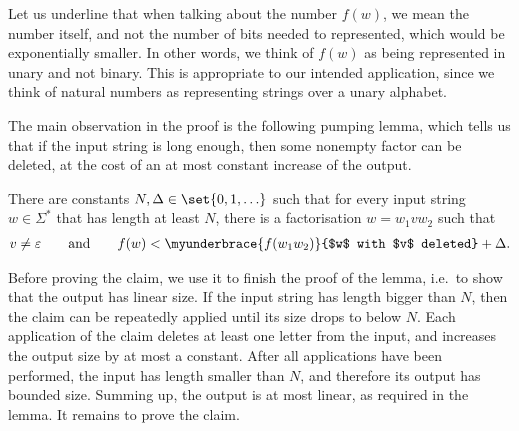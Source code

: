     Let us underline that when talking about the number $f(w)$, we mean the number itself, and not the number of bits needed to represented, which would be exponentially smaller. In other words, we think of $f(w)$ as being represented in unary and not binary. This is appropriate to our intended application, since we think of natural numbers as representing strings over a unary alphabet. 

The main observation in the proof is the following pumping lemma, which tells us that if the input string is long enough, then some nonempty factor can be deleted, at the cost of an at most constant increase of the output.
    \begin{claim}\label{claim:pumping}
        There are constants $N,\Delta \in \set{0,1,\ldots}$ such that for every input string $w \in \Sigma^*$ that has length at least $N$, there is a factorisation $w = w_1 v w_2$ such that 
        \begin{align*}
       v \neq \varepsilon \qquad \text{and} \qquad  f(w) < \myunderbrace{f(w_1 w_2)}{$w$ with $v$ deleted} + \Delta.
        \end{align*}
    \end{claim}
Before proving the claim, we use it to finish the proof of the lemma, i.e.~to show that the output has linear size. If the input  string has length bigger than $N$, then the claim can be repeatedly applied until its size drops to below $N$. Each application of the claim deletes at least one letter from the input, and increases the output size by at most a constant. After all applications have been performed,  the input has length smaller than $N$, and therefore its output has bounded size. Summing up, the output is at most linear, as required in the lemma. It remains to prove the claim.
